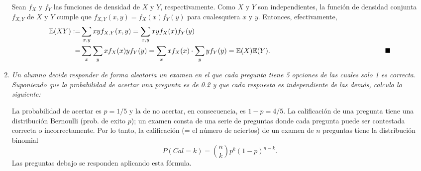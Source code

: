 \documentclass[letterpaper,11pt]{article}
\begin{document}
\begin{enumerate}
    Sean $f_X$ y $f_Y$ las funciones de densidad de $X$ y $Y$, respectivamente. Como $X$ y $Y$ son
    independientes, la función de densidad conjunta $f_{X,Y}$ de $X$ y $Y$ cumple que
    $f_{X,Y}(x,y)=f_X(x)f_Y(y)$ para cualesquiera $x$ y $y$. Entonces, efectivamente, 
    \begin{align*}
        \mathbb E(XY) :=& \sum_{x,y} xyf_{X,Y}(x,y) =\sum _{x,y}xyf_X(x)f_Y(y) \\
        = & \sum _x\sum_y xf_X(x)yf_Y(y)=\sum _xxf_X(x)\cdot \sum _yyf_Y(y)= 
        \mathbb E(X)\mathbb E(Y).\hspace{5.8cm} \blacksquare
            \end{align*}
\item \emph{Un alumno decide responder de forma aleatoria un examen en el que cada pregunta tiene
5 opciones de las cuales solo 1 es correcta. Suponiendo que la probabilidad de acertar una
pregunta es de 0.2 y que cada respuesta es independiente de las demás, calcula lo siguiente:}

La probabilidad de acertar es $p=1/5$ y la de no acertar, en consecuencia, es $1-p=4/5$. La calificación de
una pregunta tiene una distribución Bernoulli (prob. de exito $p$); un examen consta de una serie 
de preguntas donde
cada pregunta puede ser contestada correcta o incorrectamente. Por lo tanto, la calificación
(= el número de aciertos) de un examen de $n$ preguntas tiene la distribución binomial 
\[P(Cal=k)=\binom{n}{k}p^k(1-p)^{n-k}.\]
Las preguntas debajo se responden aplicando esta fórmula. 
\begin{itemize} 


\end{itemize}
\end{enumerate}
\end{document}
